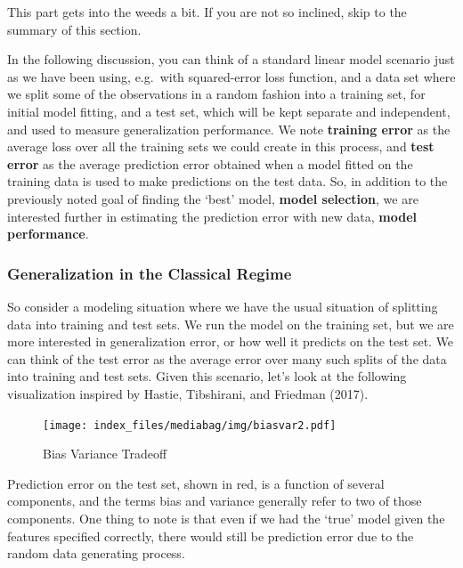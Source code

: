 \documentclass[
  letterpaper,
]{krantz}
\begin{document}
This part gets into the weeds a bit. If you are not so inclined, skip to
the summary of this section.

In the following discussion, you can think of a standard linear model
scenario just as we have been using, e.g.~with squared-error loss
function, and a data set where we split some of the observations in a
random fashion into a training set, for initial model fitting, and a
test set, which will be kept separate and independent, and used to
measure generalization performance. We note \textbf{training error} as
the average loss over all the training sets we could create in this
process, and \textbf{test error} as the average prediction error
obtained when a model fitted on the training data is used to make
predictions on the test data. So, in addition to the previously noted
goal of finding the `best' model, \textbf{model selection}, we are
interested further in estimating the prediction error with new data,
\textbf{model performance}.

\subsubsection{Generalization in the Classical
Regime}\label{generalization-in-the-classical-regime}

So consider a modeling situation where we have the usual situation of
splitting data into training and test sets. We run the model on the
training set, but we are more interested in generalization error, or how
well it predicts on the test set. We can think of the test error as the
average error over many such splits of the data into training and test
sets. Given this scenario, let's look at the following visualization
inspired by Hastie, Tibshirani, and Friedman (2017).

\begin{figure}

{\centering \texttt{[image: index\_files/mediabag/img/biasvar2.pdf]}

}

\caption{\label{fig-bias-variance}Bias Variance Tradeoff}

\end{figure}

Prediction error on the test set, shown in red, is a function of several
components, and the terms bias and variance generally refer to two of
those components. One thing to note is that even if we had the `true'
model given the features specified correctly, there would still be
prediction error due to the random data generating process.
\end{document}
